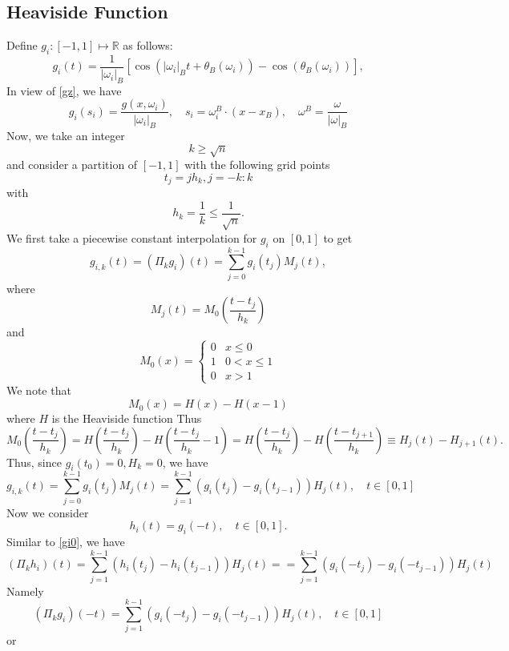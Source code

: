 \subsection{Heaviside Function}
Define $g_i: [-1,1]\mapsto \mathbb R$ as
follows:
\begin{equation}
	\label{psi}
	g_i(t)=\frac{1}{|\omega_i|_B}[\cos(|\omega_i|_Bt+\theta_B(\omega_i))  -\cos(\theta_B(\omega_i))],
\end{equation}
In view of \eqref{gz}, we have
\begin{equation}
	\label{gpsi}
	g_i(s_i)=\frac{g(x,\omega_i)}{|\omega_i|_B}, \quad s_i=\omega_i^B\cdot(x-x_B),\quad \omega^B=\frac{\omega}{|\omega|_B}
\end{equation}
Now, we take an integer
\begin{equation}
	\label{k}
	k\ge \sqrt{n}  
\end{equation}
and consider a partition of $[-1,1]$ with the following grid points
$$
t_j=jh_k, j=-k:k
$$
with 
$$
h_k=\frac{1}{k}\le \frac{1}{\sqrt{n}}.
$$
We first take a piecewise constant interpolation for $g_i$ on $[0,1]$ to get
$$
g_{i,k}(t)=(\Pi_kg_i)(t)=\sum_{j=0}^{k-1}g_i(t_j) M_j(t),   
$$
where
$$
M_j(t)=M_0(\frac{t-t_j}{h_k})
$$
and
\begin{equation}
	\label{cardinal}
	M_0(x)=
	\left\{
	\begin{array}{ll}
		0 & x\le0 \\
		1 & 0< x\le1    \\
		0 & x > 1    
	\end{array}
	\right.
\end{equation}
We note that
$$
M_0(x)=H(x)-H(x-1)
$$
where $H$ is the Heaviside function
Thus
$$
M_0(\frac{t-t_{j}}{h_k})
=H(\frac{t-t_{j}}{h_k})-H(\frac{t-t_{j}}{h_k}-1)=H(\frac{t-t_{j}}{h_k})-H(\frac{t-t_{j+1}}{h_k})
\equiv H_{j}(t)-H_{j+1}(t).
$$
Thus, since $g_i(t_0)=0, H_k=0$, we have
\begin{equation}  \label{gi0}
	g_{i,k}(t)=\sum_{j=0}^{k-1}g_i(t_j) M_j(t)
	=\sum_{j=1}^{k-1}(g_i(t_j) - g_i(t_{j-1})) H_{j}(t), \quad t\in [0,1]
\end{equation}
Now we consider
\begin{equation}
	h_i(t) = g_i(-t), \quad t\in [0,1].
\end{equation}
Similar to \eqref{gi0}, we have
$$
(\Pi_kh_i)(t)=\sum_{j=1}^{k-1}(h_i(t_j) - h_i(t_{j-1}))H_j(t)=
=\sum_{j=1}^{k-1}(g_i(-t_j) - g_i(-t_{j-1}))H_j(t)
$$
Namely
$$
(\Pi_k g_i)(-t)=\sum_{j=1}^{k-1}(g_i(-t_j) - g_i(-t_{j-1}))H_j(t), \quad t\in [0,1]
$$
or
